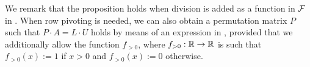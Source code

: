 We remark that the proposition holds when division is added as a function in $\mathcal{F}$
in \langfor. When row pivoting is needed, we can also obtain a permutation matrix
$P$ such that $P\cdot A=L\cdot U$ holds by means of an expression in \langfor, provided
that we additionally allow the function $f_{>0}$, %
where $f_{>0}:\mathbb{R}\to\mathbb{R}$ is such that $f_{>0}(x):=1$ if $x>0$ and $f_{>0}(x):=0$ otherwise.

%
%

%

